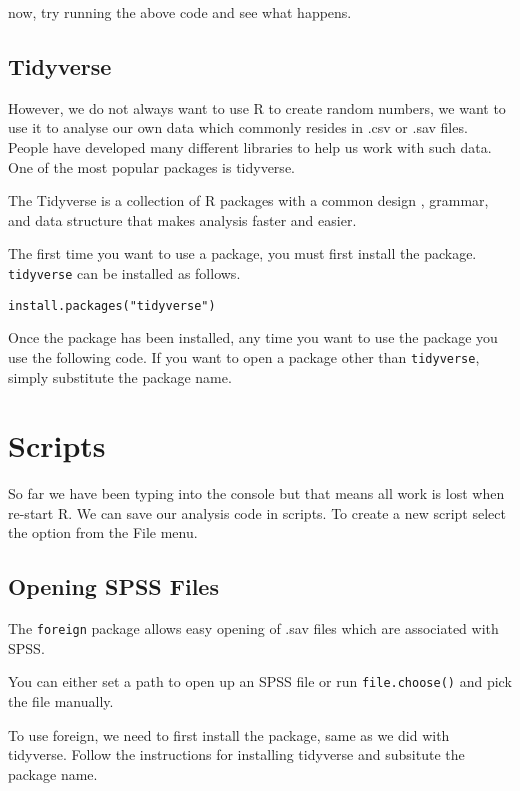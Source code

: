\documentclass[]{book}
\begin{document}
now, try running the above code and see what happens.

\hypertarget{tidyverse}{%
\subsection{Tidyverse}\label{tidyverse}}

However, we do not always want to use R to create random numbers, we want to use it to analyse our own data which commonly resides in .csv or .sav files. People have developed many different libraries to help us work with such data. One of the most popular packages is tidyverse.

The Tidyverse is a collection of R packages with a common design , grammar, and data structure that makes analysis faster and easier.

The first time you want to use a package, you must first install the package. \texttt{tidyverse} can be installed as follows.

\begin{verbatim}
install.packages("tidyverse")
\end{verbatim}

Once the package has been installed, any time you want to use the package you use the following code. If you want to open a package other than \texttt{tidyverse}, simply substitute the package name.

\hypertarget{scripts}{%
\section{Scripts}\label{scripts}}

So far we have been typing into the console but that means all work is lost when re-start R. We can save our analysis code in scripts. To create a new script select the option from the File menu.

\hypertarget{opening-spss-files}{%
\subsection{Opening SPSS Files}\label{opening-spss-files}}

The \texttt{foreign} package allows easy opening of .sav files which are associated with SPSS.

You can either set a path to open up an SPSS file or run \texttt{file.choose()} and pick the file manually.

To use foreign, we need to first install the package, same as we did with tidyverse. Follow the instructions for installing tidyverse and subsitute the package name.
\end{document}
